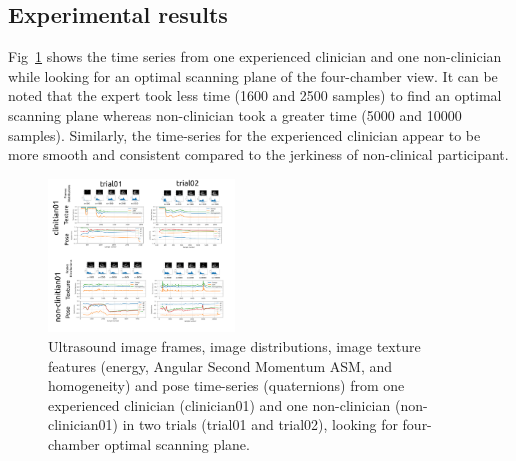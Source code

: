 \documentclass[a4paper, 10pt, conference]{ieeeconf}      %
\begin{document}
\subsection{Experimental results}
Fig~\ref{fig:results} shows the time series from one experienced clinician and one non-clinician while looking for an optimal scanning plane of the four-chamber view.
It can be noted that the expert took less time (1600 and 2500 samples) to find an optimal scanning plane whereas non-clinician took a greater time (5000 and 10000 samples).
Similarly, the time-series for the experienced clinician appear to be more smooth and consistent compared to the jerkiness of non-clinical participant. 
\begin{figure}[t]
\centering
\includegraphics[width=0.44\textwidth]{fig-results-02-participants-02-trials.png} %
\caption{
Ultrasound image frames, image distributions, image texture features (energy, Angular Second Momentum ASM, and homogeneity) and pose time-series (quaternions) from one experienced clinician (clinician01) and one non-clinician (non-clinician01) in two trials (trial01 and trial02), looking for four-chamber optimal scanning plane. 
       } 
\label{fig:results}
\end{figure}

 
\end{document}
